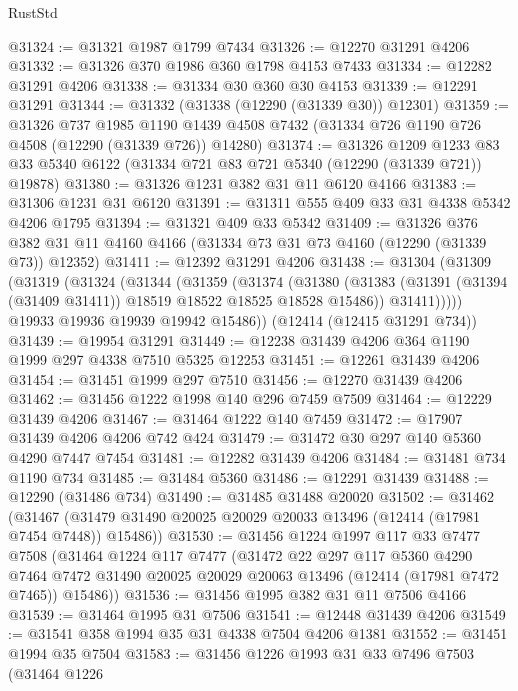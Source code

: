 \begin{lexlean}{RustStd}
\begin{coremodule}
@31324 := @31321 @1987 @1799 @7434
@31326 := @12270 @31291 @4206
@31332 := @31326 @370 @1986 @360 @1798 @4153 @7433
@31334 := @12282 @31291 @4206
@31338 := @31334 @30 @360 @30 @4153
@31339 := @12291 @31291
@31344 := @31332 (@31338 (@12290 (@31339 @30)) @12301)
@31359 := @31326
    @737
    @1985
    @1190
    @1439
    @4508
    @7432
    (@31334 @726 @1190 @726 @4508 (@12290 (@31339 @726)) @14280)
@31374 := @31326
    @1209
    @1233
    @83
    @33
    @5340
    @6122
    (@31334 @721 @83 @721 @5340 (@12290 (@31339 @721)) @19878)
@31380 := @31326 @1231 @382 @31 @11 @6120 @4166
@31383 := @31306 @1231 @31 @6120
@31391 := @31311 @555 @409 @33 @31 @4338 @5342 @4206 @1795
@31394 := @31321 @409 @33 @5342
@31409 := @31326
    @376
    @382
    @31
    @11
    @4160
    @4166
    (@31334 @73 @31 @73 @4160 (@12290 (@31339 @73)) @12352)
@31411 := @12392 @31291 @4206
@31438 := @31304
    (@31309
      (@31319
        (@31324
          (@31344
            (@31359
              (@31374
                (@31380
                  (@31383 (@31391 (@31394 (@31409 @31411)) @18519 @18522 @18525 @18528 @15486))
                  @31411)))))
        @19933
        @19936
        @19939
        @19942
        @15486))
    (@12414 (@12415 @31291 @734))
@31439 := @19954 @31291
@31449 := @12238 @31439 @4206 @364 @1190 @1999 @297 @4338 @7510 @5325 @12253
@31451 := @12261 @31439 @4206
@31454 := @31451 @1999 @297 @7510
@31456 := @12270 @31439 @4206
@31462 := @31456 @1222 @1998 @140 @296 @7459 @7509
@31464 := @12229 @31439 @4206
@31467 := @31464 @1222 @140 @7459
@31472 := @17907 @31439 @4206 @4206 @742 @424
@31479 := @31472 @30 @297 @140 @5360 @4290 @7447 @7454
@31481 := @12282 @31439 @4206
@31484 := @31481 @734 @1190 @734
@31485 := @31484 @5360
@31486 := @12291 @31439
@31488 := @12290 (@31486 @734)
@31490 := @31485 @31488 @20020
@31502 := @31462
    (@31467 (@31479 @31490 @20025 @20029 @20033 @13496 (@12414 (@17981 @7454 @7448)) @15486))
@31530 := @31456
    @1224
    @1997
    @117
    @33
    @7477
    @7508
    (@31464
      @1224
      @117
      @7477
      (@31472
        @22
        @297
        @117
        @5360
        @4290
        @7464
        @7472
        @31490
        @20025
        @20029
        @20063
        @13496
        (@12414 (@17981 @7472 @7465))
        @15486))
@31536 := @31456 @1995 @382 @31 @11 @7506 @4166
@31539 := @31464 @1995 @31 @7506
@31541 := @12448 @31439 @4206
@31549 := @31541 @358 @1994 @35 @31 @4338 @7504 @4206 @1381
@31552 := @31451 @1994 @35 @7504
@31583 := @31456
    @1226
    @1993
    @31
    @33
    @7496
    @7503
    (@31464
      @1226

\end{coremodule}
\end{lexlean}
